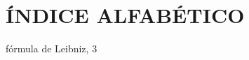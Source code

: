 \chapter*{\'INDICE ALFAB\'ETICO}



\begin{theindex}

  \item f\'ormula
    \subitem de Leibniz, 3

\end{theindex}
